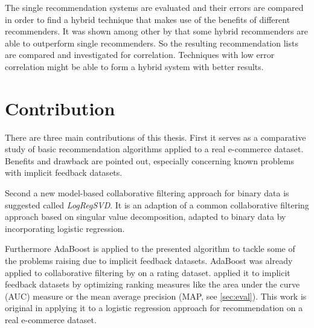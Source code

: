 \documentclass[10pt]{reportMaster}
\begin{document}
The single recommendation systems are evaluated and their errors are compared in order to find a hybrid technique that makes use of the benefits of different recommenders.
It was shown among other by \cite{hybridSurvey} that some hybrid recommenders are able to outperform single recommenders. %
So the resulting recommendation lists are compared and investigated for correlation.
Techniques with low error correlation might be able to form a hybrid system with better results.


\section{Contribution}
There are three main contributions of this thesis.
First it serves as a comparative study of basic recommendation algorithms applied to a real e-commerce dataset.
Benefits and drawback are pointed out, especially concerning known problems with implicit feedback datasets.

Second a new model-based collaborative filtering approach for binary data is suggested called \textit{LogRegSVD}.
It is an adaption of a common collaborative filtering approach based on singular value decomposition, adapted to binary data by incorporating logistic regression.

Furthermore AdaBoost is applied to the presented algorithm to tackle some of the problems raising due to implicit feedback datasets.
AdaBoost was already applied to collaborative filtering by \cite{boostingCFRatings} on a rating dataset.
\cite{boostingAUC} applied it to implicit feedback datasets by optimizing ranking measures like the area under the curve (AUC) measure or the mean average precision (MAP, see \ref{sec:eval}).
This work is original in applying it to a logistic regression approach for recommendation on a real e-commerce dataset.
\end{document}

